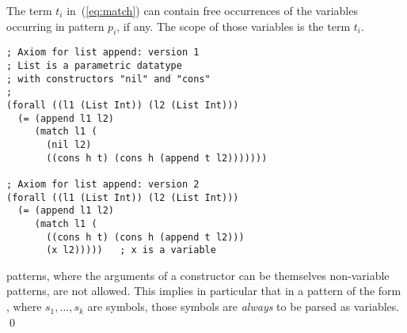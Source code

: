 The term $t_i$ in~(\ref{eq:match}) can contain free occurrences 
of the variables occurring in pattern $p_i$, if any.
The scope of those variables is the term $t_i$.

\begin{lstlisting}[linewidth=29em]
; Axiom for list append: version 1
; List is a parametric datatype 
; with constructors "nil" and "cons"
;
(forall ((l1 (List Int)) (l2 (List Int)))
  (= (append l1 l2)
     (match l1 (
       (nil l2)
       ((cons h t) (cons h (append t l2)))))))

; Axiom for list append: version 2
(forall ((l1 (List Int)) (l2 (List Int)))
  (= (append l1 l2)
     (match l1 (
       ((cons h t) (cons h (append t l2)))
       (x l2)))))   ; x is a variable
\end{lstlisting}

\begin{remark}
 patterns, where the arguments of a constructor can be themselves
non-variable patterns, are not allowed.
This implies in particular that in a pattern of the form ,
where $s_1, \ldots, s_k$ are symbols, those symbols are \emph{always} to be parsed as variables.
\qed
\end{remark}

